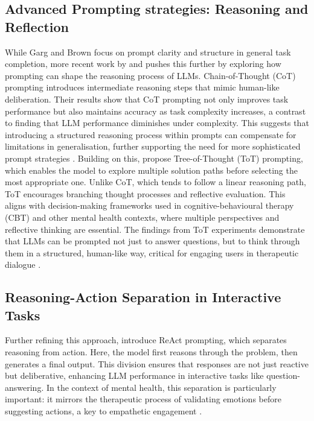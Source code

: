 \subsection{Advanced Prompting strategies: Reasoning and Reflection} 
While Garg and Brown focus on prompt clarity and structure in general task completion, more recent work by \cite{wang2022self} and \cite{yao2023tree} pushes this further by exploring how prompting can shape the reasoning process of LLMs. \cite{wang2022self} Chain-of-Thought (CoT) prompting introduces intermediate reasoning steps that mimic human-like deliberation. Their results show that CoT prompting not only improves task performance but also maintains accuracy as task complexity increases, a contrast to \cite{garg2021transformers} finding that LLM performance diminishes under complexity. This suggests that introducing a structured reasoning process within prompts can compensate for limitations in generalisation, further supporting the need for more sophisticated prompt strategies \cite{wang2022self}.
Building on this, \cite{yao2023tree} propose Tree-of-Thought (ToT) prompting, which enables the model to explore multiple solution paths before selecting the most appropriate one. Unlike CoT, which tends to follow a linear reasoning path, ToT encourages branching thought processes and reflective evaluation. This aligns with decision-making frameworks used in cognitive-behavioural therapy (CBT) and other mental health contexts, where multiple perspectives and reflective thinking are essential. The findings from ToT experiments demonstrate that LLMs can be prompted not just to answer questions, but to think through them in a structured, human-like way, critical for engaging users in therapeutic dialogue \cite{yao2023tree}.

\subsection{Reasoning-Action Separation in Interactive Tasks} 
Further refining this approach, \cite{yao2022react} introduce ReAct prompting, which separates reasoning from action. Here, the model first reasons through the problem, then generates a final output. This division ensures that responses are not just reactive but deliberative, enhancing LLM performance in interactive tasks like question-answering. In the context of mental health, this separation is particularly important: it mirrors the therapeutic process of validating emotions before suggesting actions, a key to empathetic engagement \cite{yao2022react}.

